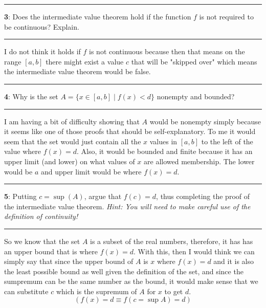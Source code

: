 \documentclass[11pt]{article}
\newcommand\question[2]{\vspace{.25in}\hrule\textbf{#1}: #2\vspace{.5em}\hrule\vspace{.10in}}
\begin{document}
\question{3}{Does the intermediate value theorem hold if the function $f$ is not required to be continuous? Explain.}

I do not think it holds if $f$ is not continuous because then that means on the range $[a,b]$ there might exist a value $c$ that will be "skipped over" which means the intermediate value theorem would be false.


\question{4}{Why is the set $A=\{x \in [a,b] \mid f(x) < d\}$ nonempty and bounded?}

I am having a bit of difficulty showing that $A$ would be nonempty simply because it seems like one of those proofs that should be self-explanatory. To me it would seem that the set would just contain all the $x$ values in $[a,b]$ to the left of the value where $f(x) = d$. Also, it would be bounded and finite because it has an upper limit (and lower) on what values of $x$ are allowed membership. The lower would be $a$ and upper limit would be where $f(x) =d$.


\question{5}{Putting $c=\sup(A)$, argue that $f(c) = d$, thus completing the proof of the intermediate value theorem. \textit{Hint: You will need to make careful use of the definition of continuity!}}

So we know that the set $A$ is a subset of the real numbers, therefore, it has has an upper bound that is where $f(x)=d$. With this, then I would think we can simply say that since the upper bound of $A$ is $x$ where $f(x)=d$ and it is also the least possible bound as well given the definition of the set, and since the sumpremum can be the same number as the bound, it would make sense that we can substitute $c$ which is the supremum of $A$ for $x$ to get $d$. $$(f(x) = d \equiv f(c=\sup{A}) = d)$$

	
\end{document}
